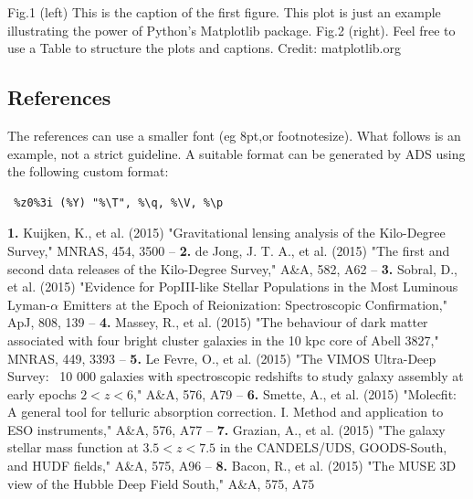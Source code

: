 \documentclass{article}
\begin{document}
Fig.1 (left) This is the caption of the first figure. This plot is just an example illustrating the power of Python's Matplotlib package. Fig.2 (right). Feel free to use a Table to structure the plots and captions. Credit: matplotlib.org

\subsection{References}

The references can use a smaller font (eg 8pt,or footnotesize). What follows is an example, not a strict guideline. A suitable format can be generated by ADS using the following custom format: 
\begin{verbatim} %z0%3i (%Y) "%\T", %\q, %\V, %\p 
\end{verbatim}

{\footnotesize
{\bf 1.} Kuijken, K., et al. (2015) "Gravitational lensing analysis of the Kilo-Degree Survey," MNRAS,  454,  3500  -- 
{\bf 2.} de Jong, J. T. A., et al. (2015) "The first and second data releases of the Kilo-Degree Survey," A\&A,  582,  A62 -- 
{\bf 3.} Sobral, D., et al. (2015) "Evidence for PopIII-like Stellar Populations in the Most Luminous Lyman-$\alpha$ Emitters at the Epoch of Reionization: Spectroscopic Confirmation," ApJ,  808,  139 -- 
{\bf 4.} Massey, R., et al. (2015) "The behaviour of dark matter associated with four bright cluster galaxies in the 10 kpc core of Abell 3827," MNRAS,  449,  3393 -- 
{\bf 5.} Le Fevre, O., et al. (2015) "The VIMOS Ultra-Deep Survey: ~10 000 galaxies with spectroscopic redshifts to study galaxy assembly at early epochs $2 < z < 6$," A\&A,  576,  A79 -- 
{\bf 6.} Smette, A., et al. (2015) "Molecfit: A general tool for telluric absorption correction. I. Method and application to ESO instruments," A\&A,  576,  A77 -- 
{\bf 7.} Grazian, A., et al. (2015) "The galaxy stellar mass function at $3.5 < z < 7.5$ in the CANDELS/UDS, GOODS-South, and HUDF fields," A\&A,  575,  A96 -- 
{\bf 8.} Bacon, R., et al. (2015) "The MUSE 3D view of the Hubble Deep Field South," A\&A,  575,  A75 
}
\end{document}
